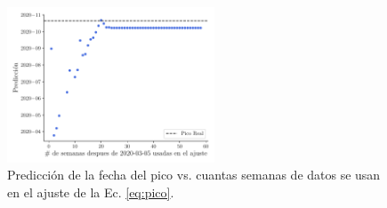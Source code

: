 \documentclass[twocolumn,aps,prl]{revtex4-1}
\begin{document}
\begin{figure}[ht!]
  \centering
      \centering
      \includegraphics[width = 0.55\textwidth]{figuras/ex02-prediccion-semanas.pdf} 
      \caption{Predicción de la fecha del pico vs. cuantas semanas de datos se usan en el ajuste de la Ec. \ref{eq:pico}.}
      \label{fig:ex02-semanas}
\end{figure}
\end{document}
